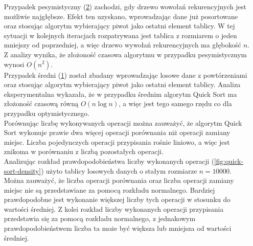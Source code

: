 Przypadek pesymistyczny (\ref{fig:quick-sort-pessimistic}) zachodzi, gdy drzewo wowołań rekurencyjnych jest możliwie najgłębsze. Efekt ten uzyskano, wprowadzając dane już posortowane oraz stosując algorytm wybierający piwot jako ostatni element tablicy. W tej sytuacji w kolejnych iteracjach rozpatrywana jest tablica z rozmiarem o jeden mniejszy od poprzedniej, a więc drzewo wywołań rekurencyjnych ma głębokość $n$. Z analizy wynika, że złożoność czasowa algorytmu w przypadku pesymistycznym wynosi $O(n^2)$.\\

Przypadek średni (\ref{fig:quick-sort-optimistic-average}) został zbadany wprowadzając losowe dane z powtórzeniami oraz stosując algorytm wybierający piwot jako ostatni element tablicy. Analiza eksperymentalna wykazała, że w przypadku średnim algorytm Quick Sort ma złożoność czasową równą $O(n\log{}n)$, a więc jest tego samego rzędu co dla przypadku optymistycznego.\\

Porównując liczbę wykonywanych operacji można zauważyć, że algorytm Quick Sort wykonuje prawie dwa więcej operacji porównania
niż operacji zamiany miejsc. Liczba pojedynczych operacji przypisania rośnie liniowo, a więc jest znikoma w porównaniu z
liczbą pozostałych operacji.\\

Analizując rozkład prawdopodobieństwa liczby wykonanych operacji (\ref{fig:quick-sort-density}) użyto tablicy losowych danych o stałym rozmiarze $n = 10000$. Można zauważyć, że liczba operacji porównania oraz liczba operacji zamiany miejsc nie są przedstawiane za pomocą rozkładu normalnego. Bardziej prawdopodobne jest wykonanie większej liczby tych operacji w stosunku do wartości średniej. Z kolei rozkład liczby wykonanych operacji przypisania przedstawia się za pomocą rozkładu normalnego, z jednakowym prawdopodobieństwem liczba ta może być większa lub mniejsza od wartości średniej.\\

\begin{figure}[H]
	\centering
	
	\caption[]{}
	\label{fig:quick-sort-optimistic-average}
\end{figure}

\begin{figure}[H]
	\centering
	
	\caption[]{}
	\label{fig:quick-sort-pessimistic}
\end{figure}

